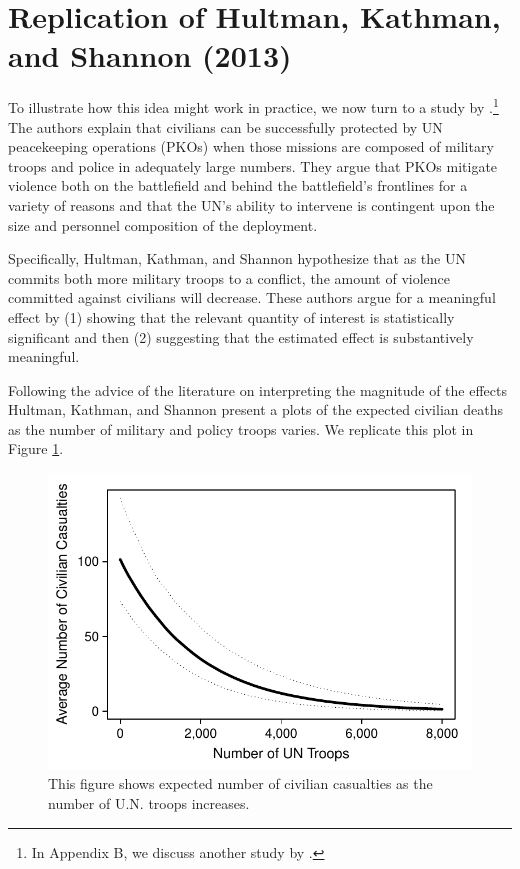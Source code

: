 \documentclass[12pt]{article}
\begin{document}
\section*{Replication of Hultman, Kathman, and Shannon (2013)}

To illustrate how this idea might work in practice, we now turn to a study by \cite{HultmanKathmanShannon2013}.\footnote{In Appendix B, we discuss another study by \cite{KamZechmeister2013}.} The authors explain that civilians can be successfully protected by UN peacekeeping operations (PKOs) when those missions are composed of military troops and police in adequately large numbers. They argue that PKOs mitigate violence both on the battlefield and behind the battlefield's frontlines for a variety of reasons and that the UN's ability to intervene is contingent upon the size and personnel composition of the deployment.

Specifically, Hultman, Kathman, and Shannon hypothesize that as the UN commits both more military troops to a conflict, the amount of violence committed against civilians will decrease. These authors argue for a meaningful effect by (1) showing that the relevant quantity of interest is statistically significant and then (2) suggesting that the estimated effect is substantively meaningful.

Following the advice of the literature on interpreting the magnitude of the effects Hultman, Kathman, and Shannon present a plots of the expected civilian deaths as the number of military and policy troops varies. We replicate this plot in Figure \ref{fig:hks-ev}.

\begin{figure}[H]
\begin{center}
\includegraphics[scale = .8]{figs/hks-ev.pdf}
\caption{This figure shows expected number of civilian casualties as the number of U.N. troops increases.}\label{fig:hks-ev}
\end{center}
\end{figure}
\end{document}
